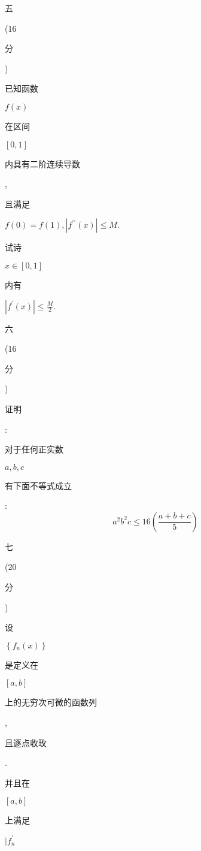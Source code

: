 \documentclass[10pt]{article}
\begin{document}
\begin{CJK}{UTF8}{mj}五\end{CJK} (16 \begin{CJK}{UTF8}{mj}分\end{CJK}) \begin{CJK}{UTF8}{mj}已知函数\end{CJK} $f(x)$ \begin{CJK}{UTF8}{mj}在区间\end{CJK} $[0,1]$ \begin{CJK}{UTF8}{mj}内具有二阶连续导数\end{CJK}, \begin{CJK}{UTF8}{mj}且满足\end{CJK} $f(0)=f(1),\left|f^{\prime \prime}(x)\right| \leq M$. \begin{CJK}{UTF8}{mj}试诗\end{CJK} $x \in[0,1]$ \begin{CJK}{UTF8}{mj}内有\end{CJK} $\left|f^{\prime}(x)\right| \leq \frac{M}{2}$.

\begin{CJK}{UTF8}{mj}六\end{CJK} (16 \begin{CJK}{UTF8}{mj}分\end{CJK}) \begin{CJK}{UTF8}{mj}证明\end{CJK}: \begin{CJK}{UTF8}{mj}对于任何正实数\end{CJK} $a, b, c$ \begin{CJK}{UTF8}{mj}有下面不等式成立\end{CJK}:
$$
a^{2} b^{2} c \leq 16\left(\frac{a+b+c}{5}\right)
$$
\begin{CJK}{UTF8}{mj}七\end{CJK} (20 \begin{CJK}{UTF8}{mj}分\end{CJK}) \begin{CJK}{UTF8}{mj}设\end{CJK} $\left\{f_{n}(x)\right\}$ \begin{CJK}{UTF8}{mj}是定义在\end{CJK} $[a, b]$ \begin{CJK}{UTF8}{mj}上的无穷次可微的函数列\end{CJK}, \begin{CJK}{UTF8}{mj}且逐点收玫\end{CJK}. \begin{CJK}{UTF8}{mj}并且在\end{CJK} $[a, b]$ \begin{CJK}{UTF8}{mj}上满足\end{CJK} $\mid f_{n}^{\prime}$
\end{document}
